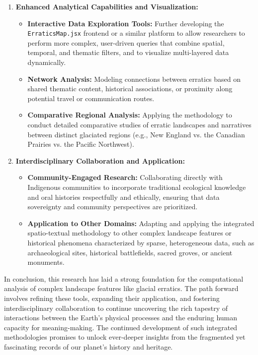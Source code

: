 \documentclass[
11pt, %
english, %
singlespacing, %
headsepline, %
]{MastersDoctoralThesis} %
\begin{document}
\begin{enumerate}
    \item \textbf{Enhanced Analytical Capabilities and Visualization:}
        \begin{itemize}
            \item \textbf{Interactive Data Exploration Tools:} Further developing the \\ \texttt{ErraticsMap.jsx} frontend or a similar platform to allow researchers to perform more complex, user-driven queries that combine spatial, temporal, and thematic filters, and to visualize multi-layered data dynamically.
            \item \textbf{Network Analysis:} Modeling connections between erratics based on shared thematic content, historical associations, or proximity along potential travel or communication routes.
            \item \textbf{Comparative Regional Analysis:} Applying the methodology to conduct detailed comparative studies of erratic landscapes and narratives between distinct glaciated regions (e.g., New England vs. the Canadian Prairies vs. the Pacific Northwest).
        \end{itemize}

    \item \textbf{Interdisciplinary Collaboration and Application:}
        \begin{itemize}
            \item \textbf{Community-Engaged Research:} Collaborating directly with Indigenous communities to incorporate traditional ecological knowledge and oral histories respectfully and ethically, ensuring that data sovereignty and community perspectives are prioritized.
            \item \textbf{Application to Other Domains:} Adapting and applying the integrated spatio-textual methodology to other complex landscape features or historical phenomena characterized by sparse, heterogeneous data, such as archaeological sites, historical battlefields, sacred groves, or ancient monuments.
        \end{itemize}
\end{enumerate}

In conclusion, this research has laid a strong foundation for the computational analysis of complex landscape features like glacial erratics. The path forward involves refining these tools, expanding their application, and fostering interdisciplinary collaboration to continue uncovering the rich tapestry of interactions between the Earth's physical processes and the enduring human capacity for meaning-making. The continued development of such integrated methodologies promises to unlock ever-deeper insights from the fragmented yet fascinating records of our planet's history and heritage.
\end{document}
